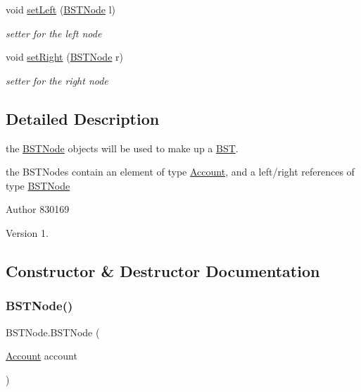 \begin{DoxyCompactItemize}
void \hyperlink{class_b_s_t_node_a5bb0ba5ce7d5663bd4b17809e14d4a6c}{set\+Left} (\hyperlink{class_b_s_t_node}{B\+S\+T\+Node} l)
\begin{DoxyCompactList}\small\item\em setter for the left node \end{DoxyCompactList}\item 
void \hyperlink{class_b_s_t_node_a945445bf310d0f27f15eff0726c01f03}{set\+Right} (\hyperlink{class_b_s_t_node}{B\+S\+T\+Node} r)
\begin{DoxyCompactList}\small\item\em setter for the right node \end{DoxyCompactList}\end{DoxyCompactItemize}


\subsection{Detailed Description}
the \hyperlink{class_b_s_t_node}{B\+S\+T\+Node} objects will be used to make up a \hyperlink{class_b_s_t}{B\+ST}. 

the B\+S\+T\+Nodes contain an element of type \hyperlink{class_account}{Account}, and a left/right references of type \hyperlink{class_b_s_t_node}{B\+S\+T\+Node}

\begin{DoxyAuthor}{Author}
830169 
\end{DoxyAuthor}
\begin{DoxyVersion}{Version}
1. 
\end{DoxyVersion}


\subsection{Constructor \& Destructor Documentation}
\mbox{\label{class_b_s_t_node_aaa051f6a85f1cbc75800579027bce3cf}} 
\subsubsection{\texorpdfstring{B\+S\+T\+Node()}{BSTNode()}}
{\footnotesize\ttfamily B\+S\+T\+Node.\+B\+S\+T\+Node (\begin{DoxyParamCaption}\item[{\hyperlink{class_account}{Account}}]{account }\end{DoxyParamCaption})}



